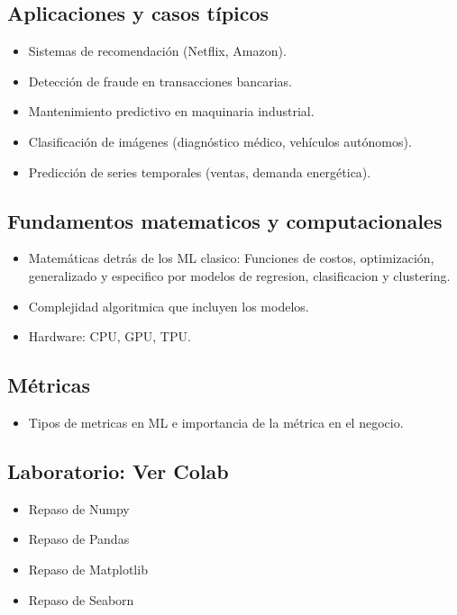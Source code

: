 \documentclass[12pt,a4paper,openany,oneside]{book}
\begin{document}
\begin{itemize}
\subsection{Aplicaciones y casos típicos}
\begin{itemize}
    \item Sistemas de recomendación (Netflix, Amazon).
    \item Detección de fraude en transacciones bancarias.
    \item Mantenimiento predictivo en maquinaria industrial.
    \item Clasificación de imágenes (diagnóstico médico, vehículos autónomos).
    \item Predicción de series temporales (ventas, demanda energética).
\end{itemize}

\subsection{Fundamentos matematicos y computacionales}
\begin{itemize}
    \item Matemáticas detrás de los ML clasico: Funciones de costos, optimización, generalizado y especifico por modelos de regresion, clasificacion y clustering.
    \item Complejidad algoritmica que incluyen los modelos.
    \item Hardware: CPU, GPU, TPU.
\end{itemize}

\subsection{Métricas}
\begin{itemize}
    \item Tipos de metricas en ML e importancia de la métrica en el negocio.
\end{itemize}

\subsection{Laboratorio: Ver Colab}
\begin{itemize}
    \item Repaso de Numpy
    \item Repaso de Pandas
    \item Repaso de Matplotlib
    \item Repaso de Seaborn
\end{itemize}


\end{itemize}
\end{document}
